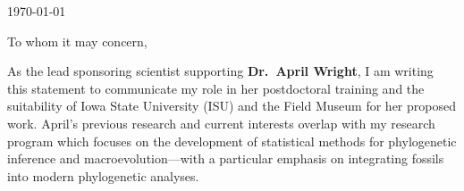 \documentclass[11pt]{article}
\begin{document}
\thispagestyle{fancy}
\begin{flushright}
\today
\end{flushright}
\vspace{2mm}



\noindent To whom it may concern,

As the lead sponsoring scientist supporting \textbf{Dr.\ April Wright}, I am writing this statement to communicate my role in her postdoctoral training and the suitability of Iowa State University (ISU) and the Field Museum for her proposed work. 
April's previous research and current interests overlap with my research program which focuses on the development of statistical methods for phylogenetic inference and macroevolution---with a particular emphasis on integrating fossils into modern phylogenetic analyses.
\end{document}
